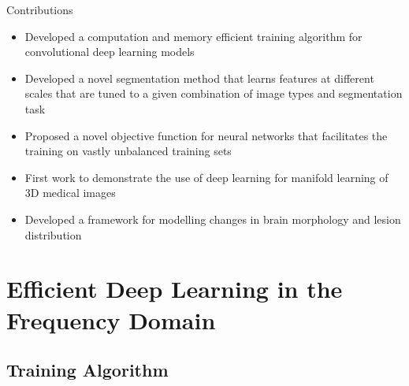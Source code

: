 \documentclass{beamer}
\begin{document}
\begin{frame}{Contributions}
\begin{itemize}
\item Developed a computation and memory efficient training algorithm for
convolutional deep learning models
\vspace{0.5em}
\item Developed a novel segmentation method that learns features at
different scales that are tuned to a given combination of image types and
segmentation task
\item Proposed a novel objective function for neural networks that facilitates
the training on vastly unbalanced training sets
\vspace{0.5em}
\item First work to demonstrate the use of deep learning for manifold learning
of 3D medical images
\item Developed a framework for modelling changes in brain morphology and lesion
distribution
\end{itemize}
\end{frame}

\section[Deep Learning in the Frequency Domain]{Efficient Deep Learning in the
Frequency Domain}

\subsection{Training Algorithm}
\end{document}
